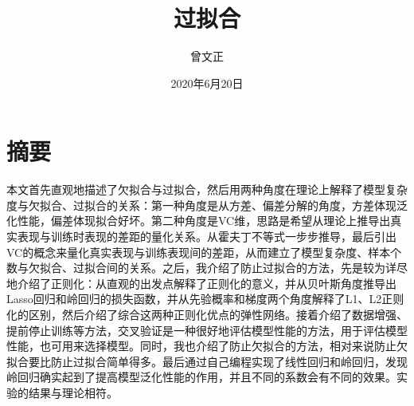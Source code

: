 \documentclass[forprint]{report}
\begin{document}

\title{过拟合} %
\author{曾文正} %
\date{2020年6月20日} %


\maketitle
\frontmatter
{}              %

\tableofcontents
\thispagestyle{empty}				%


\mainmatter %
\pagestyle{plain}%
\baselineskip=23pt  %

\chapter{摘要}
本文首先直观地描述了欠拟合与过拟合，然后用两种角度在理论上解释了模型复杂度与欠拟合、过拟合的关系：第一种角度是从方差、偏差分解的角度，方差体现泛化性能，偏差体现拟合好坏。第二种角度是VC维，思路是希望从理论上推导出真实表现与训练时表现的差距的量化关系。从霍夫丁不等式一步步推导，最后引出VC的概念来量化真实表现与训练表现间的差距，从而建立了模型复杂度、样本个数与欠拟合、过拟合间的关系。之后，我介绍了防止过拟合的方法，先是较为详尽地介绍了正则化：从直观的出发点解释了正则化的意义，并从贝叶斯角度推导出Lasso回归和岭回归的损失函数，并从先验概率和梯度两个角度解释了L1、L2正则化的区别，然后介绍了综合这两种正则化优点的弹性网络。接着介绍了数据增强、提前停止训练等方法，交叉验证是一种很好地评估模型性能的方法，用于评估模型性能，也可用来选择模型。同时，我也介绍了防止欠拟合的方法，相对来说防止欠拟合要比防止过拟合简单得多。最后通过自己编程实现了线性回归和岭回归，发现岭回归确实起到了提高模型泛化性能的作用，并且不同的系数会有不同的效果。实验的结果与理论相符。
\end{document}
